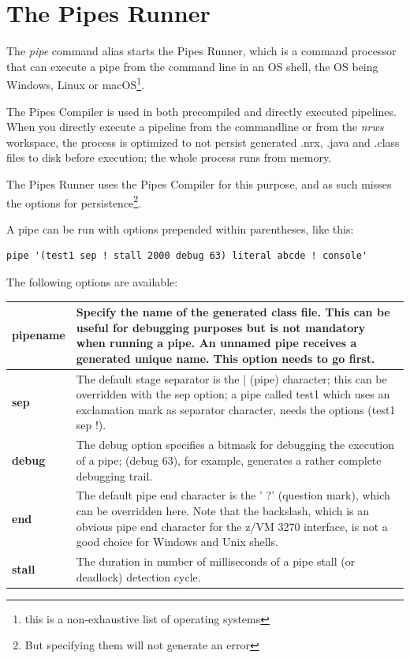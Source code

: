 \chapter{The Pipes Runner}\label{pipesrunner}

The \emph{pipe} command alias starts the Pipes Runner, which is a
command processor that can execute a pipe from the command line in an
OS shell, the OS being Windows, Linux or macOS\footnote{this is a
  non-exhaustive list of operating systems}.

The Pipes Compiler is used in both precompiled and directly executed
pipelines. When you directly execute a pipeline from the commandline
or from the \emph{nrws} \nr{} workspace, the process is optimized to not persist
generated .nrx, .java and .class files to disk before execution; the
whole process runs from memory.

The Pipes Runner uses the Pipes
Compiler for this purpose, and as such misses the options for
persistence\footnote{But specifying them will not generate an error}.

A pipe can be run with options prepended within parentheses, like this:
\begin{lstlisting}
pipe '(test1 sep ! stall 2000 debug 63) literal abcde ! console'
\end{lstlisting}

The following options are
available:

\begin{tabularx}{\textwidth}{>{\bfseries}lX}
\toprule
pipename&Specify the name of the generated class file. This
can be useful for debugging purposes but is not mandatory when running
a pipe. An unnamed pipe receives a generated unique name. This option
needs to go first.
\\\midrule
sep&The default stage separator is the |
(pipe) character; this can be overridden with the sep option; a pipe
called test1 which uses an exclamation mark as separator character,
needs the options (test1 sep !).
\\\midrule
debug&The debug option specifies a bitmask for
debugging the execution of a pipe; (debug 63), for
example, generates a rather complete debugging trail.
\\\midrule
end&The default pipe end character is the ' ?'
  (question mark), which can be overridden here. Note that the
  backslash, which is an obvious pipe end character for the z/VM 3270
  interface, is not a good choice for Windows and Unix shells.
\\\midrule
stall& The duration in number of milliseconds of a pipe stall (or deadlock)
detection cycle.
\\\bottomrule
\end{tabularx}



